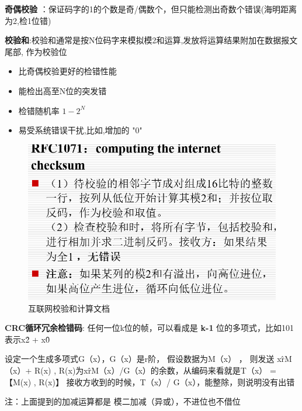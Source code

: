 \documentclass[UTF8,a4paper]{ctexart}
\begin{document}
  \textbf{奇偶校验} ：保证码字的1的个数是奇/偶数个，但只能检测出奇数个错误(海明距离为2,检1位错)

  \textbf{校验和}:校验和通常是按N位码字来模拟模2和运算,发放将运算结果附加在数据报文尾部, 作为校验位
  \begin{itemize}
    \item 比奇偶校验更好的检错性能
    \item 能检出高至N位的突发错
    \item 检错随机率 $1-2^N$
    \item 易受系统错误干扰,比如,增加的 "0"
  \end{itemize}
  \begin{figure}[H]
    \centering
    \includegraphics[scale = 0.3]{assets/jisuanjiwangluo_08665.png}
    \caption{互联网校验和计算文档}
  \end{figure}


  \textbf{CRC循环冗余检错码}:
  任何一位k位的帧，可以看成是 \textbf{k-1} 位的多项式，比如101表示x\^2 + x\^0

  设定一个生成多项式G（x），G（x）是r阶，
  假设数据为M（x） ， 则发送 x\^rM（x）+ R(x) , R(x)为x\^rM（x）/G（x）的余数，从编码来看就是T（x） = 【M(x) , R(x)】
  接收方收到的时候，T（x）/ G（x），能整除，则说明没有出错

  注：上面提到的加减运算都是 模二加减（异或），不进位也不借位
\end{document}

